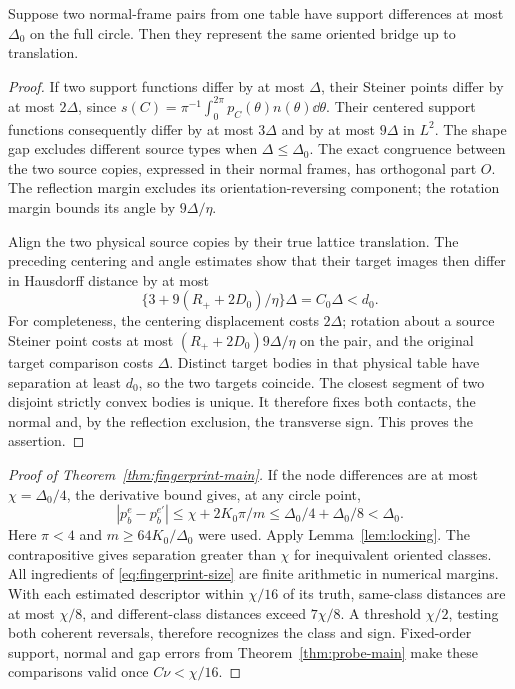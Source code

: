 \begin{lemma}\label{lem:locking}
Suppose two normal-frame pairs from one table have support differences
at most $\Delta_0$ on the full circle. Then they represent the same
oriented bridge up to translation.
\end{lemma}
\begin{proof}
If two support functions differ by at most $\Delta$, their Steiner
points differ by at most $2\Delta$, since
$s(C)=\pi^{-1}\int_0^{2\pi}p_C(\theta)n(\theta)\dd\theta$.
Their centered support functions consequently differ by at most
$3\Delta$ and by at most $9\Delta$ in $L^2$. The shape gap excludes
different source types when $\Delta\le\Delta_0$. The exact congruence
between the two source copies, expressed in their normal frames, has
orthogonal part $O$. The reflection margin excludes its orientation-reversing
component; the rotation margin bounds its angle by $9\Delta/\eta$.

Align the two physical source copies by their true lattice translation.
The preceding centering and angle estimates show that their target
images then differ in Hausdorff distance by at most
\[
 \{3+9(R_++2D_0)/\eta\}\Delta=C_0\Delta<d_0.
\]
For completeness, the centering displacement costs $2\Delta$; rotation
about a source Steiner point costs at most
$(R_++2D_0)9\Delta/\eta$ on the pair, and the original target comparison
costs $\Delta$. Distinct target bodies in that physical table have
separation at least $d_0$, so the two targets coincide. The closest
segment of two disjoint strictly convex bodies is unique. It therefore
fixes both contacts, the normal and, by the reflection exclusion, the
transverse sign. This proves the assertion.
\end{proof}

\begin{proof}[Proof of Theorem~\ref{thm:fingerprint-main}]
If the node differences are at most $\chi=\Delta_0/4$, the derivative
bound gives, at any circle point,
\[
 |p_b^e-p_b^{e'}|\le\chi+2K_0\pi/m
                          \le\Delta_0/4+\Delta_0/8<\Delta_0.
\]
Here $\pi<4$ and $m\ge64K_0/\Delta_0$ were used. Apply
Lemma~\ref{lem:locking}. The contrapositive gives separation greater
than $\chi$ for inequivalent oriented classes. All ingredients of
\eqref{eq:fingerprint-size} are finite arithmetic in numerical margins.
With each estimated descriptor within $\chi/16$ of its truth, same-class
distances are at most $\chi/8$, and different-class distances exceed
$7\chi/8$. A threshold $\chi/2$, testing both coherent reversals,
therefore recognizes the class and sign. Fixed-order support, normal
and gap errors from Theorem~\ref{thm:probe-main} make these comparisons
valid once $C\nu<\chi/16$.
\end{proof}

